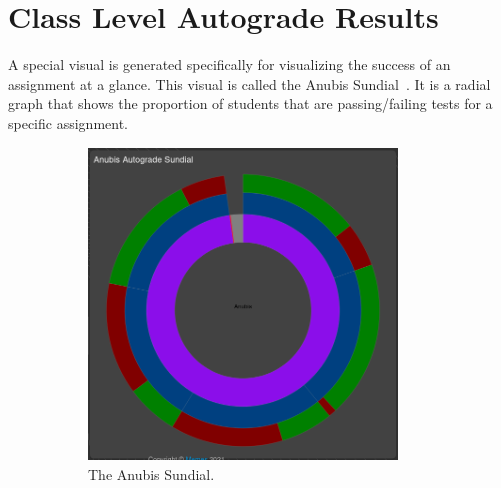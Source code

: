 \section{Class Level Autograde Results}\label{sec:class-level-results}

A special visual is generated specifically for visualizing the success of an assignment at a glance.
This visual is called the Anubis Sundial~.
It is a radial graph that shows the proportion of students that are passing/failing tests
for a specific assignment.

\begin{figure}[ht]
    \centering
    \begin{subfigure}{0.5\textwidth}
        \centering
        \includegraphics[width=0.9\textwidth]{figures/sundial-1}
        \caption{The Anubis Sundial.\label{fig:autograde-sundial-1} }
    \end{subfigure}%
    \begin{subfigure}{0.5\textwidth}
        \centering

\end{subfigure}
\end{figure}
